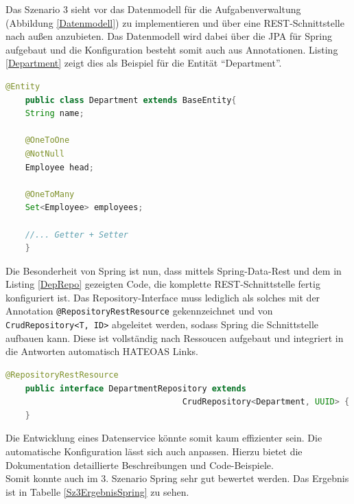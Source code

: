 Das Szenario 3 sieht vor das Datenmodell für die Aufgabenverwaltung (Abbildung \ref{Datenmodell}) zu implementieren und über eine \ac{REST}-Schnittstelle nach außen anzubieten. Das Datenmodell wird dabei über die \ac{JPA} für Spring aufgebaut und die Konfiguration besteht somit auch aus Annotationen. Listing \ref{Department} zeigt dies als Beispiel für die Entität \enquote{Department}.

\begin{minipage}{\linewidth}
	\begin{lstlisting}[caption={Umsetzung der Entität \enquote{Department} mittels JPA},label=Department,language=JAVA] 
	@Entity
	public class Department extends BaseEntity{
	String name;
	
	@OneToOne
	@NotNull
	Employee head;
	
	@OneToMany
	Set<Employee> employees;
	
	//... Getter + Setter 
	}
	\end{lstlisting}
\end{minipage}

Die Besonderheit von Spring ist nun, dass mittels Spring-Data-Rest und dem in Listing \ref{DepRepo} gezeigten Code, die komplette \ac{REST}-Schnittstelle fertig konfiguriert ist. Das Repository-Interface muss lediglich als solches mit der Annotation \lstinline|@RepositoryRestResource| gekennzeichnet und von \lstinline|CrudRepository<T, ID>| abgeleitet werden, sodass Spring die Schnittstelle aufbauen kann. Diese ist vollständig nach Ressoucen aufgebaut und integriert in die Antworten automatisch \acs{HATEOAS} Links.

\begin{minipage}{\linewidth}
	\begin{lstlisting}[caption={Erstellung der REST-Schnittstelle für das \enquote{Department} über ein Interface},label=DepRepo,language=JAVA] 
	@RepositoryRestResource
	public interface DepartmentRepository extends 
									CrudRepository<Department, UUID> { 
	}
	\end{lstlisting}
\end{minipage}

Die Entwicklung eines Datenservice könnte somit kaum effizienter sein. Die automatische Konfiguration lässt sich auch anpassen. Hierzu bietet die Dokumentation detaillierte Beschreibungen und Code-Beispiele.\\
Somit konnte auch im 3. Szenario Spring sehr gut bewertet werden. Das Ergebnis ist in Tabelle \ref{Sz3ErgebnisSpring} zu sehen.

